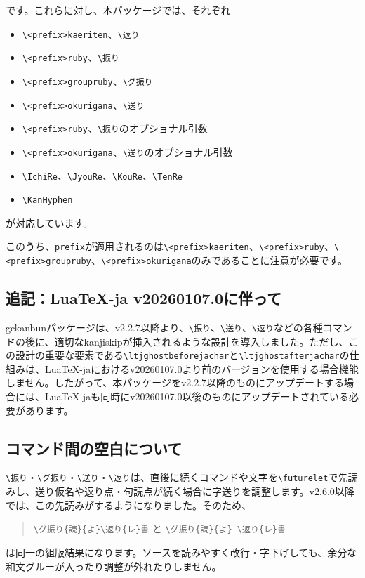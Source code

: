 \documentclass[luatex,fontsize=8pt,paper=b5,twoside]{jlreq}%
\begin{document}
\noindent です。これらに対し、本パッケージでは、それぞれ

\begin{itemize}
  \item \verb|\<prefix>kaeriten|、\verb|\返り|
  \item \verb|\<prefix>ruby|、\verb|\振り|
  \item \verb|\<prefix>groupruby|、\verb|\グ振り|
  \item \verb|\<prefix>okurigana|、\verb|\送り|
  \item \verb|\<prefix>ruby|、\verb|\振り|のオプショナル引数
  \item \verb|\<prefix>okurigana|、\verb|\送り|のオプショナル引数
  \item \verb|\IchiRe|、\verb|\JyouRe|、\verb|\KouRe|、\verb|\TenRe|
  \item \verb|\KanHyphen|
\end{itemize}

\noindent が対応しています。

このうち、\texttt{prefix}が適用されるのは\verb|\<prefix>kaeriten|、\verb|\<prefix>ruby|、\verb|\<prefix>groupruby|、\verb|\<prefix>okurigana|のみであることに注意が必要です。

\subsection{追記：LuaTeX-ja v20260107.0に伴って}
gckanbunパッケージは、v2.2.7以降より、\verb|\振り|、\verb|\送り|、\verb|\返り|などの各種コマンドの後に、適切なkanjiskipが挿入されるような設計を導入しました。ただし、この設計の重要な要素である\verb|\ltjghostbeforejachar|と\verb|\ltjghostafterjachar|の仕組みは、LuaTeX-jaにおけるv20260107.0より前のバージョンを使用する場合機能しません。したがって、本パッケージをv2.2.7以降のものにアップデートする場合には、LuaTeX-jaも同時にv20260107.0以後のものにアップデートされている必要があります。

\subsection{コマンド間の空白について}
\verb|\振り|・\verb|\グ振り|・\verb|\送り|・\verb|\返り|は、直後に続くコマンドや文字を\verb|\futurelet|で先読みし、送り仮名や返り点・句読点が続く場合に字送りを調整します。v2.6.0以降では、この先読みがするようになりました。そのため、
\begin{quotation}
\verb|\グ振り{読}{よ}\返り{レ}書| と \verb|\グ振り{読}{よ} \返り{レ}書|
\end{quotation}
\noindent は同一の組版結果になります。ソースを読みやすく改行・字下げしても、余分な和文グルーが入ったり調整が外れたりしません。
\end{document}
